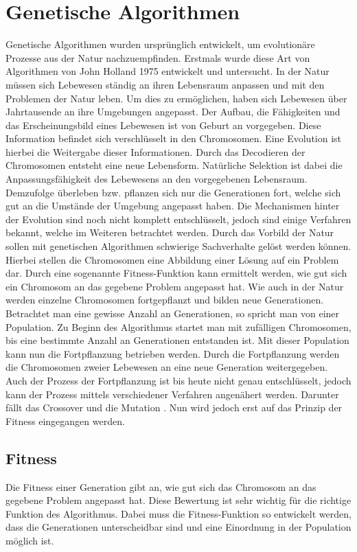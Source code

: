 \section{Genetische Algorithmen}
\label{sec:genetischer_algo}
Genetische Algorithmen wurden ursprünglich entwickelt, um evolutionäre Prozesse aus der Natur nachzuempfinden. Erstmals wurde diese Art von Algorithmen von John Holland 1975 entwickelt und untersucht.
In der Natur müssen sich Lebewesen ständig an ihren Lebensraum anpassen und mit den Problemen der Natur leben. Um dies zu ermöglichen, haben sich Lebewesen über Jahrtausende an ihre Umgebungen angepasst. Der Aufbau, die Fähigkeiten und das Erscheinungsbild eines Lebewesen ist von Geburt an vorgegeben. Diese Information befindet sich  verschlüsselt in den Chromosomen. Eine Evolution ist hierbei die Weitergabe dieser Informationen. Durch das Decodieren der Chromosomen entsteht eine neue Lebensform.
Natürliche Selektion ist dabei die Anpassungsfähigkeit des Lebewesens an den vorgegebenen Lebensraum. Demzufolge überleben bzw. pflanzen sich nur die Generationen fort, welche sich gut an die Umstände der Umgebung angepasst haben. Die Mechanismen hinter der Evolution sind noch nicht komplett entschlüsselt, jedoch sind einige Verfahren bekannt, welche im Weiteren betrachtet werden.
Durch das Vorbild der Natur sollen mit genetischen Algorithmen schwierige Sachverhalte gelöst werden können. Hierbei stellen die Chromosomen eine Abbildung einer Lösung auf ein Problem dar. Durch eine sogenannte Fitness-Funktion kann ermittelt werden, wie gut sich ein Chromosom an das gegebene Problem angepasst hat. Wie auch in der Natur werden einzelne Chromosomen fortgepflanzt und bilden neue Generationen. Betrachtet man eine gewisse Anzahl an Generationen, so spricht man von einer Population. Zu Beginn des Algorithmus startet man mit zufälligen Chromosomen, bis eine bestimmte Anzahl an Generationen entstanden ist. Mit dieser Population kann nun die Fortpflanzung betrieben werden.
Durch die Fortpflanzung werden die Chromosomen zweier Lebewesen an eine neue Generation weitergegeben. Auch der Prozess der Fortpflanzung ist bis heute nicht genau entschlüsselt, jedoch kann der Prozess mittels verschiedener Verfahren angenähert werden. Darunter fällt das Crossover und die Mutation \cite{davis1991handbook}. Nun wird jedoch erst auf das Prinzip der Fitness eingegangen werden. 

\subsection{Fitness}
Die Fitness einer Generation gibt an, wie gut sich das Chromosom an das gegebene Problem angepasst hat. Diese Bewertung ist sehr wichtig für die richtige Funktion des Algorithmus. Dabei muss die Fitness-Funktion so entwickelt werden, dass die Generationen unterscheidbar sind und eine Einordnung in der Population möglich ist.\cite{davis1991handbook}


